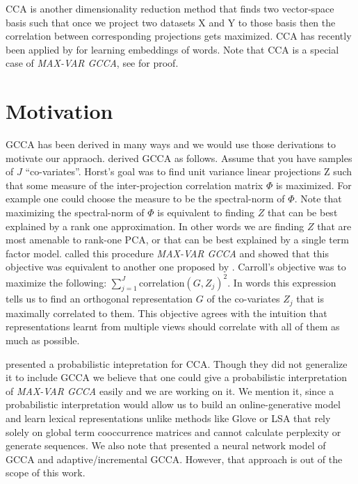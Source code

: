 \documentclass[11pt]{article}
\begin{document}
CCA is another dimensionality reduction method that finds two vector-space basis such that
once we project two datasets X and Y to those basis then the
correlation between corresponding projections gets
maximized\cite{hotelling1935the}. CCA has recently been applied by
\cite{dhillon2011multi,dhillon2012two,faruqui2014improving} for
learning embeddings of words. Note that CCA is a special case of
\emph{MAX-VAR GCCA}, see \cite{velden2011on} for proof.

\section{Motivation}
\label{sec:motivation}
GCCA has been derived in many ways and we would use those derivations
to motivate our appraoch. \cite{horst1961generalized} derived GCCA as follows. Assume that you have samples of $J$
``co-variates''. Horst's goal was to find unit variance linear
projections $\textrm{Z}$ such that some measure of the inter-projection correlation
matrix $\Phi$ is maximized. For example one could choose the measure to be
the spectral-norm of $\Phi$. Note that maximizing the spectral-norm of $\Phi$ is equivalent to
finding $Z$ that can be best explained by a rank 
one approximation. In other words we are finding $Z$ that are most
amenable to rank-one PCA, or that can be best explained by a single
term factor model. \cite{kettenring1971canonical} called this procedure
\emph{MAX-VAR GCCA} and showed that this
objective was equivalent to another one proposed by
\cite{carroll1968generalization}. Carroll's objective was to maximize the following: $\sum_{j=1}^J
\textrm{correlation}(G, Z_j)^2$. In
words this expression tells us to find an orthogonal  
representation $G$ of the co-variates $Z_j$ that is maximally
correlated to them. This objective agrees with the intuition that representations
learnt from multiple views should correlate with all of them as much
as possible.

\cite{bach2005probabilistic} presented a probabilistic
intepretation for CCA. Though they did not generalize it to
include GCCA we believe that one could give a probabilistic
interpretation of \emph{MAX-VAR GCCA} easily and we are working on
it. We mention it, since a probabilistic
interpretation would allow us to build an online-generative model and learn
lexical representations unlike methods like Glove or LSA that rely
solely on global term cooccurrence matrices and cannot calculate
perplexity or generate sequences. We also note that
\cite{via2007learning} presented a neural network model of GCCA and 
adaptive/incremental GCCA. However, that approach is out of the scope of this work.
\end{document}
